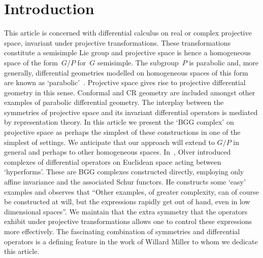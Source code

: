 \documentclass[pdftex]{sigma}
\begin{document}
\section{Introduction}
This article is concerned with dif\/ferential calculus on real or complex
projective space, in\-variant under projective transformations. These
transformations constitute a semisimple Lie group and projective space is hence
a homogeneous space of the form~$G/P$ for~$G$ semisimple. The subgroup~$P$ is
parabolic and, more generally, dif\/ferential geometries modelled on homogeneous
spaces of this form are known as `parabolic'~\cite{thebook}. Projective space
gives rise to projective dif\/ferential geometry in this sense. Conformal and CR
geometry are included amongst other examples of parabolic dif\/ferential
geometry. The interplay between the symmetries of projective space and its
invariant dif\/ferential operators is mediated by representation theory. In this
article we present the `BGG complex' on projective space as perhaps the
simplest of these constructions in one of the simplest of settings. We
anticipate that our approach will extend to $G/P$ in general and perhaps to
other homogeneous spaces. In~\cite{o}, Olver introduced complexes of
dif\/ferential operators on Euclidean space acting between `hyperforms'. These
are BGG complexes constructed directly, employing only af\/f\/ine invariance and
the associated Schur functors. He constructs some `easy' examples and observes
that ``Other examples, of greater complexity, can of course be constructed at
will, but the expressions rapidly get out of hand, even in low dimensional
spaces''. We maintain that the extra symmetry that the operators exhibit under
projective transformations allows one to control these expressions more
ef\/fectively. The fascinating combination of symmetries and dif\/ferential
operators is a def\/ining feature in the work of Willard Miller to whom we
dedicate this article.
\end{document}
